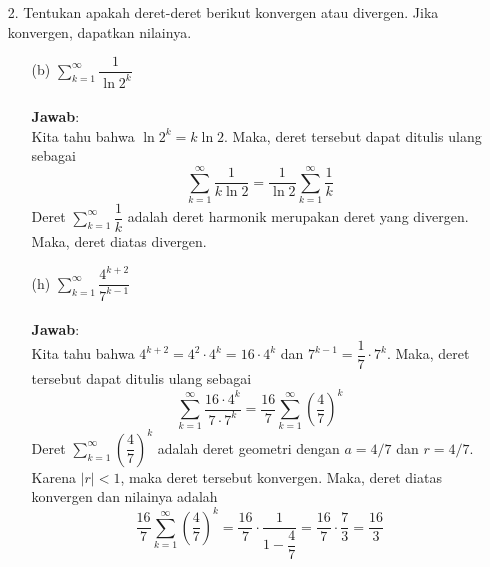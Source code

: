 \documentclass{article}
\newcommand{\jawab}{\textbf{Jawab}:}
\begin{document}
    \begin{enumerate}
        \item[2.] Tentukan apakah deret-deret berikut konvergen atau divergen. Jika konvergen, dapatkan nilainya.
        \begin{enumerate}
            \item[(b)] $\displaystyle \sum_{k=1}^{\infty} \dfrac{1}{\ln 2^k}$\\\\
            \jawab\\
            Kita tahu bahwa $\ln 2^k = k\ln 2$. Maka, deret tersebut dapat ditulis ulang sebagai
            \[\sum_{k=1}^{\infty} \dfrac{1}{k\ln 2} = \dfrac{1}{\ln 2}\sum_{k=1}^{\infty} \dfrac{1}{k}\]
            Deret $\displaystyle \sum_{k=1}^{\infty} \dfrac{1}{k}$ adalah deret harmonik merupakan deret yang divergen. Maka, deret diatas divergen.\\

            \item[(h)] $\displaystyle \sum_{k=1}^{\infty} \dfrac{4^{k+2}}{7^{k-1}}$\\\\
            \jawab\\
            Kita tahu bahwa $4^{k+2} = 4^2\cdot 4^k = 16\cdot 4^k$ dan $7^{k-1} = \dfrac{1}{7}\cdot 7^k$. Maka, deret tersebut dapat ditulis ulang sebagai
            \[\sum_{k=1}^{\infty} \dfrac{16\cdot 4^k}{7\cdot 7^k} = \dfrac{16}{7}\sum_{k=1}^{\infty} \left(\dfrac{4}{7}\right)^k\]
            Deret $\displaystyle \sum_{k=1}^{\infty} \left(\dfrac{4}{7}\right)^k$ adalah deret geometri dengan $a = 4/7$ dan $r = 4/7$. Karena $|r| < 1$, maka deret tersebut konvergen. Maka, deret diatas konvergen dan nilainya adalah
            \[\dfrac{16}{7}\sum_{k=1}^{\infty} \left(\dfrac{4}{7}\right)^k=\dfrac{16}{7}\cdot \dfrac{1}{1-\dfrac{4}{7}} = \dfrac{16}{7}\cdot \dfrac{7}{3} = \dfrac{16}{3}\]


\end{enumerate}
\end{enumerate}
\end{document}
